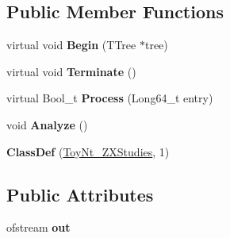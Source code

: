 \subsection*{Public Member Functions}
\begin{DoxyCompactItemize}
\item 
\hypertarget{classToyNt__ZXStudies_a8f0ccec30d23c410050699763fa95d11}{
virtual void {\bfseries Begin} (TTree $\ast$tree)}
\label{classToyNt__ZXStudies_a8f0ccec30d23c410050699763fa95d11}

\item 
\hypertarget{classToyNt__ZXStudies_abe3160b46af50772d430195bd9d63a19}{
virtual void {\bfseries Terminate} ()}
\label{classToyNt__ZXStudies_abe3160b46af50772d430195bd9d63a19}

\item 
\hypertarget{classToyNt__ZXStudies_aee258e853ab3ffd7161289a17399c9b3}{
virtual Bool\_\-t {\bfseries Process} (Long64\_\-t entry)}
\label{classToyNt__ZXStudies_aee258e853ab3ffd7161289a17399c9b3}

\item 
\hypertarget{classToyNt__ZXStudies_a3c3b86261e3a74d0ac9fa97c9f23fa2b}{
void {\bfseries Analyze} ()}
\label{classToyNt__ZXStudies_a3c3b86261e3a74d0ac9fa97c9f23fa2b}

\item 
\hypertarget{classToyNt__ZXStudies_a5ee1ac5639d64ec1304f38a6de379041}{
{\bfseries ClassDef} (\hyperlink{classToyNt__ZXStudies}{ToyNt\_\-ZXStudies}, 1)}
\label{classToyNt__ZXStudies_a5ee1ac5639d64ec1304f38a6de379041}

\end{DoxyCompactItemize}
\subsection*{Public Attributes}
\begin{DoxyCompactItemize}
\item 
\hypertarget{classToyNt__ZXStudies_ad707f0d5cfc2848f9f65fcd1168cbda1}{
ofstream {\bfseries out}}
\label{classToyNt__ZXStudies_ad707f0d5cfc2848f9f65fcd1168cbda1}

\end{DoxyCompactItemize}
